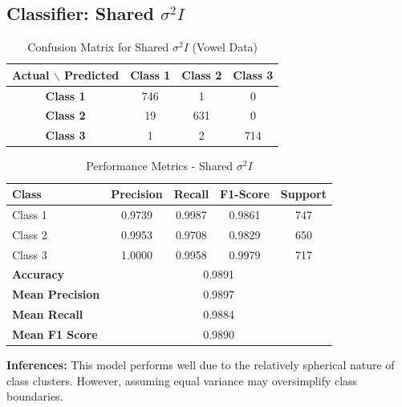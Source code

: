 \subsection{Classifier: Shared $\sigma^2 I$}


\begin{table}[H]
\centering
\caption{Confusion Matrix for Shared $\sigma^2 I$ (Vowel Data)}
\label{tab:confmat_d3_sigma2I}
\begin{tabular}{|c|c|c|c|}
\hline
\textbf{Actual $\backslash$ Predicted} & \textbf{Class 1} & \textbf{Class 2} & \textbf{Class 3} \\
\hline
\textbf{Class 1} & 746 & 1   & 0   \\
\textbf{Class 2} & 19  & 631 & 0   \\
\textbf{Class 3} & 1   & 2   & 714 \\
\hline
\end{tabular}
\end{table}

\begin{table}[H]
\centering
\caption{Performance Metrics - Shared $\sigma^2 I$}
\begin{tabular}{lcccc}
\toprule
\textbf{Class} & \textbf{Precision} & \textbf{Recall} & \textbf{F1-Score} & \textbf{Support} \\
\midrule
Class 1 & 0.9739 & 0.9987 & 0.9861 & 747 \\
Class 2 & 0.9953 & 0.9708 & 0.9829 & 650 \\
Class 3 & 1.0000 & 0.9958 & 0.9979 & 717 \\
\midrule
\textbf{Accuracy} & \multicolumn{4}{c}{0.9891} \\
\textbf{Mean Precision} & \multicolumn{4}{c}{0.9897} \\
\textbf{Mean Recall} & \multicolumn{4}{c}{0.9884} \\
\textbf{Mean F1 Score} & \multicolumn{4}{c}{0.9890} \\
\bottomrule
\end{tabular}
\end{table}

\textbf{Inferences:} This model performs well due to the relatively spherical nature of class clusters. However, assuming equal variance may oversimplify class boundaries.

